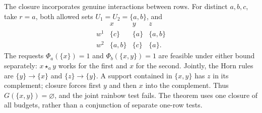 The closure incorporates genuine interactions between rows. For distinct
$a,b,c$, take $r=a$, both allowed sets $U_1=U_2=\{a,b\}$, and
\[
\begin{array}{c|ccc}
 &x&y&z\\\hline
 w^1&\{c\}&\{a\}&\{a,b\}\\
 w^2&\{a,b\}&\{c\}&\{a\}.
\end{array}
\]
The requests $\Phi_a(\{x\})=1$ and $\Phi_b(\{x,y\})=1$ are feasible
under either bound separately: $x\star_a y$ works for the first and
$x$ for the second. Jointly, the Horn rules are
$\{y\}\to\{x\}$ and $\{z\}\to\{y\}$. A support contained in
$\{x,y\}$ has $z$ in its complement; closure forces first $y$ and
then $x$ into the complement. Thus $G(\{x,y\})=\varnothing$, and
the joint rainbow test fails. The theorem uses one closure of all
budgets, rather than a conjunction of separate one-row tests.
